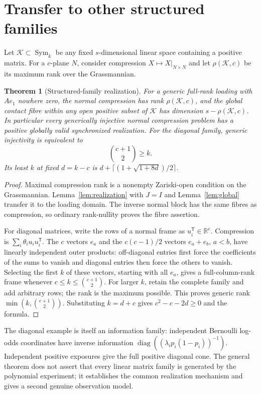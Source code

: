 \documentclass[11pt,reqno]{amsart}
\numberwithin{equation}{section}
\newtheorem{theorem}{Theorem}[section]
\theoremstyle{definition}\newtheorem{definition}[theorem]{Definition}
\theoremstyle{remark}\newtheorem{remark}[theorem]{Remark}
\newcommand{\R}{\mathbb R}
\newcommand{\Sym}{\operatorname{Sym}}
\newcommand{\diag}{\operatorname{diag}}
\begin{document}
\section{Transfer to other structured families}\label{sec:other}
Let $\mathcal K\subset\Sym_k$ be any fixed $s$-dimensional linear space containing a positive matrix. For a $c$-plane $N$, consider compression $X\mapsto X|_{N\times N}$ and let $\rho(\mathcal K,c)$ be its maximum rank over the Grassmannian.
\begin{theorem}[Structured-family realization]\label{thm:structured}
For a generic full-rank loading with $Ae_1$ nowhere zero, the normal compression has rank $\rho(\mathcal K,c)$, and the global contact fibre within any open positive subset of $\mathcal K$ has dimension $s-\rho(\mathcal K,c)$. In particular every generically injective normal compression problem has a positive globally valid synchronized realization. For the diagonal family, generic injectivity is equivalent to
\[
 \binom{c+1}{2}\ge k.
\]
Its least $k$ at fixed $d=k-c$ is $d+\lceil(1+\sqrt{1+8d})/2\rceil$.
\end{theorem}
\begin{proof}
Maximal compression rank is a nonempty Zariski-open condition on the Grassmannian. Lemma~\ref{lem:realization} with $J=I$ and Lemma~\ref{lem:global} transfer it to the loading domain. The inverse normal block has the same fibres as compression, so ordinary rank-nullity proves the fibre assertion.

For diagonal matrices, write the rows of a normal frame as $u_i^{\mathsf T}\in\R^c$. Compression is $\sum_i\theta_i u_iu_i^{\mathsf T}$. The $c$ vectors $e_a$ and the $c(c-1)/2$ vectors $e_a+e_b$, $a<b$, have linearly independent outer products: off-diagonal entries first force the coefficients of the sums to vanish and diagonal entries then force the others to vanish. Selecting the first $k$ of these vectors, starting with all $e_a$, gives a full-column-rank frame whenever $c\le k\le\binom{c+1}{2}$. For larger $k$, retain the complete family and add arbitrary rows; the rank is the maximum possible. This proves generic rank $\min(k,\binom{c+1}{2})$. Substituting $k=d+c$ gives $c^2-c-2d\ge0$ and the formula.
\end{proof}
The diagonal example is itself an information family: independent Bernoulli log-odds coordinates have inverse information $\diag((\lambda_i p_i(1-p_i))^{-1})$. Independent positive exposures give the full positive diagonal cone. The general theorem does not assert that every linear matrix family is generated by the polynomial experiment; it establishes the common realization mechanism and gives a second genuine observation model.
\end{document}
